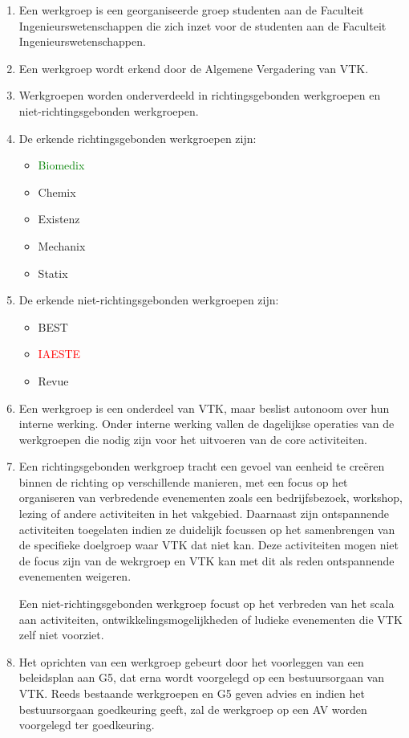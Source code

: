 \begin{enumerate}
    \item Een werkgroep is een georganiseerde groep studenten aan de Faculteit Ingenieurswetenschappen die zich inzet voor de studenten aan de Faculteit Ingenieurswetenschappen.
    \item Een werkgroep wordt erkend door de Algemene Vergadering van VTK.
    \item Werkgroepen worden onderverdeeld in richtingsgebonden werkgroepen en niet-richtingsgebonden werkgroepen.
    \item De erkende richtingsgebonden werkgroepen zijn:
    \begin{itemize}
        \item \textcolor{green}{Biomedix}
        \item Chemix
        \item Existenz
        \item Mechanix
        \item Statix
    \end{itemize}
    \item De erkende niet-richtingsgebonden werkgroepen zijn:
    \begin{itemize}
        \item BEST
        \item \textcolor{red}{IAESTE}
        \item Revue
    \end{itemize}
    \item Een werkgroep is een onderdeel van VTK, maar beslist autonoom over hun interne werking. Onder interne werking vallen de dagelijkse operaties van de werkgroepen die nodig zijn voor het uitvoeren van de core activiteiten.
    \item Een richtingsgebonden werkgroep tracht een gevoel van eenheid te creëren binnen de richting op verschillende manieren, met een focus op het organiseren van verbredende evenementen zoals een bedrijfsbezoek, workshop, lezing of andere activiteiten in het vakgebied. Daarnaast zijn ontspannende activiteiten toegelaten indien ze duidelijk focussen op het samenbrengen van de specifieke doelgroep waar VTK dat niet kan. Deze activiteiten mogen niet de focus zijn van de wekrgroep en VTK kan met dit als reden ontspannende evenementen weigeren.

    Een niet-richtingsgebonden werkgroep focust op het verbreden van het scala aan activiteiten, ontwikkelingsmogelijkheden of ludieke evenementen die VTK zelf niet voorziet.
    \item Het oprichten van een werkgroep gebeurt door het voorleggen van een beleidsplan aan G5, dat erna wordt voorgelegd op een bestuursorgaan van VTK. Reeds bestaande werkgroepen en G5 geven advies en indien het bestuursorgaan goedkeuring geeft, zal de werkgroep op een AV worden voorgelegd ter goedkeuring.


\end{enumerate}

